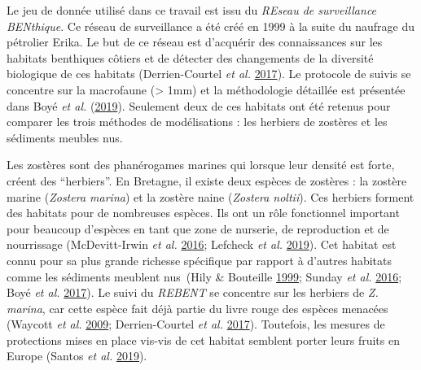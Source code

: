 \documentclass[12pt,]{article}
\begin{document}
Le jeu de donnée utilisé dans ce travail est issu du \emph{REseau de
surveillance BENthique}. Ce réseau de surveillance a été créé en 1999 à
la suite du naufrage du pétrolier Erika. Le but de ce réseau est
d'acquérir des connaissances sur les habitats benthiques côtiers et de
détecter des changements de la diversité biologique de ces habitats
(Derrien-Courtel \emph{et al.}
\protect\hyperlink{ref-Rebent2016}{2017}). Le protocole de suivis se
concentre sur la macrofaune (\textgreater{} 1mm) et la méthodologie
détaillée est présentée dans Boyé \emph{et al.}
(\protect\hyperlink{ref-Boye_2019a}{2019}). Seulement deux de ces
habitats ont été retenus pour comparer les trois méthodes de
modélisations : les herbiers de zostères et les sédiments meubles nus.

Les zostères sont des phanérogames marines qui lorsque leur densité est
forte, créent des ``herbiers''. En Bretagne, il existe deux espèces de
zostères : la zostère marine (\emph{Zostera marina}) et la zostère naine
(\emph{Zostera noltii}). Ces herbiers forment des habitats pour de
nombreuses espèces. Ils ont un rôle fonctionnel important pour beaucoup
d'espèces en tant que zone de nurserie, de reproduction et de
nourrissage (McDevitt-Irwin \emph{et al.}
\protect\hyperlink{ref-McDevitt_Irwin_2016}{2016}; Lefcheck \emph{et
al.} \protect\hyperlink{ref-Lefcheck_2019}{2019}). Cet habitat est connu
pour sa plus grande richesse spécifique par rapport à d'autres habitats
comme les sédiments meublent nus~(Hily \& Bouteille
\protect\hyperlink{ref-Hily_1999}{1999}; Sunday \emph{et al.}
\protect\hyperlink{ref-Sunday_2016}{2016}; Boyé \emph{et al.}
\protect\hyperlink{ref-Boye_2017}{2017}). Le suivi du \emph{REBENT} se
concentre sur les herbiers de \emph{Z. marina}, car cette espèce fait
déjà partie du livre rouge des espèces menacées (Waycott \emph{et al.}
\protect\hyperlink{ref-Waycott_2009}{2009}; Derrien-Courtel \emph{et
al.} \protect\hyperlink{ref-Rebent2016}{2017}). Toutefois, les mesures
de protections mises en place vis-vis de cet habitat semblent porter
leurs fruits en Europe (Santos \emph{et al.}
\protect\hyperlink{ref-de_los_Santos_2019}{2019}).
\end{document}
